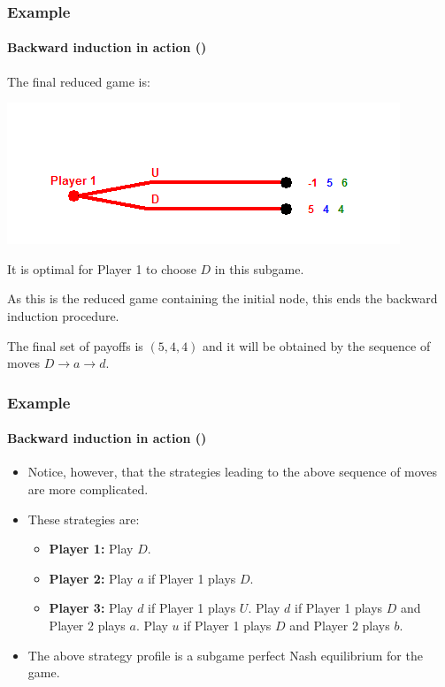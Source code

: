 \documentclass[10pt]{beamer}
\theoremstyle{definition}
\begin{document}
\begin{frame}[fragile]
\frametitle{Example }
\framesubtitle{Backward induction in action ()}
The final reduced game is:
\begin{center}
\includegraphics[width=0.65\linewidth]{Backward_induction_3}
\end{center}\bigskip

\begin{itemize}{\small
\item It is optimal for Player 1 to choose $ D $ in this subgame.
\item As this is the reduced game containing the initial node, this ends the backward induction procedure.
\item The final set of payoffs is $ (5,4,4) $ and it will be obtained by the sequence of moves $ D \rightarrow a \rightarrow d $.}
\end{itemize}
\end{frame}


\begin{frame}[fragile]
\frametitle{Example }
\framesubtitle{Backward induction in action ()}
\begin{itemize}\itemsep1em
\item Notice, however, that the strategies leading to the above sequence of moves are more complicated. 
\item These strategies are:
	\begin{itemize}\itemsep1em
	\item \textbf{Player 1:} Play $ D $.
	\item \textbf{Player 2:} Play $ a $ if Player 1 plays $ D $.
	\item \textbf{Player 3:} Play $ d $ if Player 1 plays $ U $. \newline Play $ d $ if Player 1 plays $ D $ and Player $ 2 $ plays $ a $. \newline Play $ u $ if Player 1 plays $ D $ and Player $ 2 $ plays $ b $.
	\end{itemize}
\item The above strategy profile is a subgame perfect Nash equilibrium for the game.
\end{itemize}
\end{frame}
\end{document}
